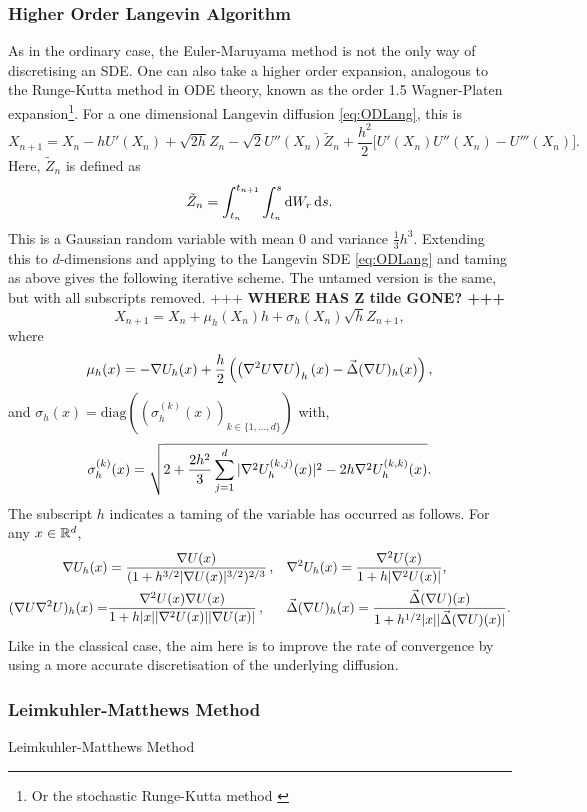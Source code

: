 \subsubsection{Higher Order Langevin Algorithm}
As in the ordinary case, the Euler-Maruyama method is not the only way of discretising an SDE. One can also take a higher order expansion, analogous to the Runge-Kutta method in ODE theory, known as the order 1.5 Wagner-Platen expansion\footnote{Or the stochastic Runge-Kutta method \cite{Schaffter10numericalintegration}}. For a one dimensional Langevin diffusion \eqref{eq:ODLang}, this is 
\[X_{n+1} = X_n -hU'(X_n)+\sqrt{2h}Z_n -\sqrt{2} U''(X_n) \tilde{Z}_n +\frac{ h^2 }{2}\bigg\lbrack U'(X_n)U''(X_n)-U'''(X_n)\bigg\rbrack.  \]
Here, \(\tilde{Z}_n\) is defined as
\[  \tilde{Z}_n = \int_{t_n}^{t_{n+1}} \int_{t_n}^s \mathop{}\!\mathrm{d} W_r \mathop{}\!\mathrm{d} s. \]
This is a Gaussian random variable with mean \(0\) and variance \(\frac{1}{3}h^3 \). Extending this to \(d\)-dimensions and applying to the Langevin SDE \eqref{eq:ODLang} and taming as above gives the following iterative scheme. The untamed version is the same, but with all subscripts removed. {+++ \bf WHERE HAS Z tilde GONE? +++}
\[X_{n+1} = X_n + \mu_{h}(X_n)h +\sigma_{h}(X_n)\sqrt{h}Z_{n+1},\]
where
\[\mu_{h}(x) = -\nabla U_{h}(x) +\frac{h}{2}\left( \left( \nabla^2U\nabla U\right)_{h}(x) - \vec{\Delta}(\nabla U)_{h}(x)\right) ,\]
and \(\sigma_{h}(x) = \text{diag}\left(\left( \sigma_{h}^{(k)}(x)\right)_{k\in \lbrace 1,\dots,d\rbrace}\right)\) with,
\[\sigma_{h}^{(k)}(x) = \sqrt{2+\frac{2h^2}{3}\sum_{j=1}^d |\nabla^2 U_{h}^{(k,j)}(x)|^2 - 2h \nabla^2 U_{h}^{(k,k)}(x)}.\]
The subscript \(h\) indicates a taming of the variable has occurred as follows. For any \(x\in \mathbb{R}^d\),
\begin{align*}
    \nabla U_h(x) &=\frac{\nabla U(x)}{(1+h^{3/2}|\nabla U(x)|^{3/2})^{2/3}}\, , && \nabla^2U_h(x) = \frac{\nabla^2 U(x)}{1+h|\nabla^2 U(x)|} ,\\
    (\nabla U\nabla^2U)_h(x) =&\frac{\nabla^2U(x)\nabla U(x)}{1+h|x||\nabla^2U(x)||\nabla U(x)|}\, , && \vec{\Delta}(\nabla U)_h(x) = \frac{\vec{\Delta}(\nabla U)(x)}{1+h^{1/2}|x||\vec{\Delta}(\nabla U)(x)|}.
\end{align*}
Like in the classical case, the aim here is to improve the rate of convergence by using a more accurate discretisation of the underlying diffusion.

\subsubsection{Leimkuhler-Matthews Method}
Leimkuhler-Matthews Method

